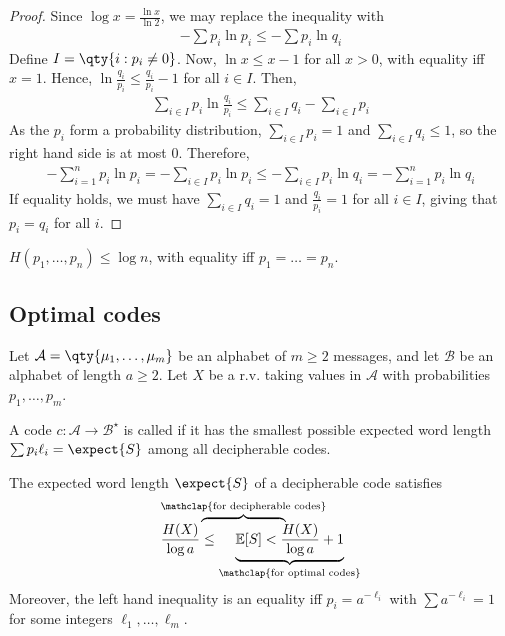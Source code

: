 \begin{proof}
    Since $\log x = \frac{\ln x}{\ln 2}$, we may replace the inequality with
    \begin{align*}
        -\sum p_i \ln p_i \leq -\sum p_i \ln q_i
    \end{align*}
    Define $I = \qty{i : p_i \neq 0}$.
    Now, $\ln x \leq x - 1$ for all $x > 0$, with equality iff $x = 1$.
    Hence, $\ln \frac{q_i}{p_i} \leq \frac{q_i}{p_i} - 1$ for all $i \in I$.
    Then,
    \begin{align*}
        \sum_{i \in I} p_i \ln \frac{q_i}{p_i} \leq \sum_{i \in I} q_i - \sum_{i \in I} p_i
    \end{align*}
    As the $p_i$ form a probability distribution, $\sum_{i \in I} p_i = 1$ and $\sum_{i \in I} q_i \leq 1$, so the right hand side is at most 0.
    Therefore,
    \begin{align*}
        -\sum_{i=1}^n p_i \ln p_i = -\sum_{i \in I} p_i \ln p_i \leq -\sum_{i \in I} p_i \ln q_i = -\sum_{i=1}^n p_i \ln q_i
    \end{align*}
    If equality holds, we must have $\sum_{i \in I} q_i = 1$ and $\frac{q_i}{p_i} = 1$ for all $i \in I$, giving that $p_i = q_i$ for all $i$.
\end{proof}

\begin{corollary}
    $H(p_1, \dots, p_n) \leq \log n$, with equality iff $p_1 = \dots = p_n$.
\end{corollary}

\subsection{Optimal codes}
Let $\mathcal A = \qty{\mu_1, \dots, \mu_m}$ be an alphabet of $m \geq 2$ messages, and let $\mathcal B$ be an alphabet of length $a \geq 2$.
Let $X$ be a r.v. taking values in $\mathcal{A}$ with probabilities $p_1, \dots, p_m$.

\begin{definition}
    A code $c \colon \mathcal A \to \mathcal B^\star$ is called  if it has the smallest possible expected word length $\sum p_i \ell_i = \expect{S}$ among all decipherable codes.
\end{definition}

\begin{theorem}
    The expected word length $\expect{S}$ of a decipherable code satisfies
    \begin{align*}
        \rlap{\(\overbrace{\phantom{\frac{H(X)}{\log a} \leq \mathbb E[S]}}^{\mathclap{\text{for decipherable codes}}}\)} \frac{H(X)}{\log a} \leq \underbrace{\mathbb E[S] < \frac{H(X)}{\log a} + 1}_{\mathclap{\text{for optimal codes}}}
    \end{align*}
    Moreover, the left hand inequality is an equality iff $p_i = a^{-\ell_i}$ with $\sum a^{-\ell_i} = 1$ for some integers $\ell_1, \dots, \ell_m$.
\end{theorem}

